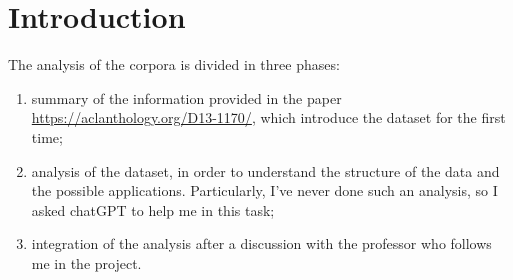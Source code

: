 \section{Introduction}

The analysis of the corpora is divided in three phases:
\begin{enumerate}
	\item summary of the information provided in the paper
		\url{https://aclanthology.org/D13-1170/}, which introduce the dataset
		for the first time;

	\item analysis of the dataset, in order to understand the structure of the
		data and the possible applications. Particularly, I've never done such
		an analysis, so I asked chatGPT to help me in this task;

	\item integration of the analysis after a discussion with the professor who
		follows me in the project.
\end{enumerate}
